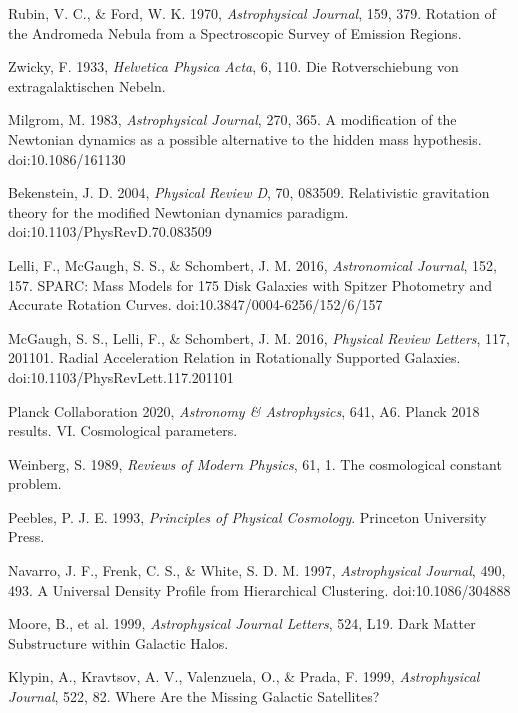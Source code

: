 \documentclass[fleqn,usenatbib]{mnras}
\begin{document}
\begin{thebibliography}{99}

 Rubin, V. C., \& Ford, W. K. 1970, \textit{Astrophysical Journal}, 159, 379. Rotation of the Andromeda Nebula from a Spectroscopic Survey of Emission Regions.

 Zwicky, F. 1933, \textit{Helvetica Physica Acta}, 6, 110. Die Rotverschiebung von extragalaktischen Nebeln.

 Milgrom, M. 1983, \textit{Astrophysical Journal}, 270, 365. A modification of the Newtonian dynamics as a possible alternative to the hidden mass hypothesis. doi:10.1086/161130

 Bekenstein, J. D. 2004, \textit{Physical Review D}, 70, 083509. Relativistic gravitation theory for the modified Newtonian dynamics paradigm. doi:10.1103/PhysRevD.70.083509

 Lelli, F., McGaugh, S. S., \& Schombert, J. M. 2016, \textit{Astronomical Journal}, 152, 157. SPARC: Mass Models for 175 Disk Galaxies with Spitzer Photometry and Accurate Rotation Curves. doi:10.3847/0004-6256/152/6/157

 McGaugh, S. S., Lelli, F., \& Schombert, J. M. 2016, \textit{Physical Review Letters}, 117, 201101. Radial Acceleration Relation in Rotationally Supported Galaxies. doi:10.1103/PhysRevLett.117.201101

 Planck Collaboration 2020, \textit{Astronomy \& Astrophysics}, 641, A6. Planck 2018 results. VI. Cosmological parameters.

 Weinberg, S. 1989, \textit{Reviews of Modern Physics}, 61, 1. The cosmological constant problem.

 Peebles, P. J. E. 1993, \textit{Principles of Physical Cosmology}. Princeton University Press.

 Navarro, J. F., Frenk, C. S., \& White, S. D. M. 1997, \textit{Astrophysical Journal}, 490, 493. A Universal Density Profile from Hierarchical Clustering. doi:10.1086/304888

 Moore, B., et al. 1999, \textit{Astrophysical Journal Letters}, 524, L19. Dark Matter Substructure within Galactic Halos.

 Klypin, A., Kravtsov, A. V., Valenzuela, O., \& Prada, F. 1999, \textit{Astrophysical Journal}, 522, 82. Where Are the Missing Galactic Satellites?


\end{thebibliography}
\end{document}

